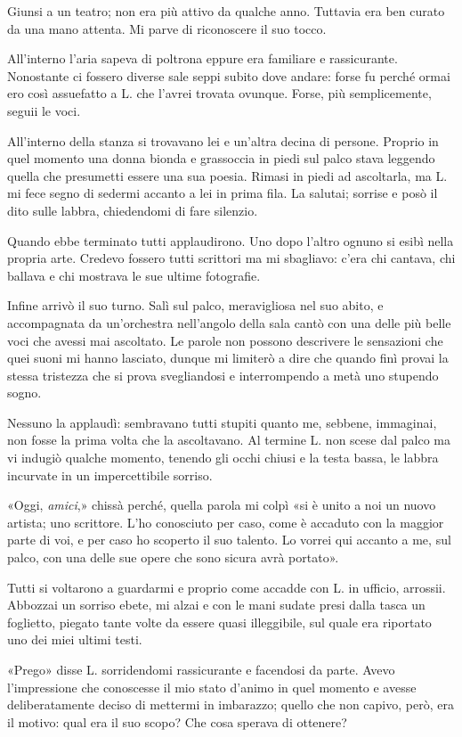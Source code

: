 \documentclass[a4paper,10pt]{memoir}
\begin{document}
Giunsi a un teatro; non era più attivo da qualche anno. Tuttavia era ben curato da una mano attenta. Mi parve di
riconoscere il suo tocco.

All'interno l'aria sapeva di poltrona eppure era familiare e rassicurante. Nonostante ci fossero diverse sale seppi
subito dove andare: forse fu perché ormai ero così assuefatto a L. che l'avrei trovata ovunque. Forse, più
semplicemente, seguii le voci.

All'interno della stanza si trovavano lei e un'altra decina di persone. Proprio in quel momento una donna bionda e
grassoccia in piedi sul palco stava leggendo quella che presumetti essere una sua poesia. Rimasi in piedi ad ascoltarla,
ma L. mi fece segno di sedermi accanto a lei in prima fila. La salutai; sorrise e posò il dito sulle labbra, chiedendomi
di fare silenzio.

Quando ebbe terminato tutti applaudirono. Uno dopo l'altro ognuno si esibì nella propria arte. Credevo fossero tutti
scrittori ma mi sbagliavo: c'era chi cantava, chi ballava e chi mostrava le sue ultime fotografie.

Infine arrivò il suo turno. Salì sul palco, meravigliosa nel suo abito, e accompagnata da un'orchestra nell'angolo della
sala cantò con una delle più belle voci che avessi mai ascoltato. Le parole non possono descrivere le sensazioni che
quei suoni mi hanno lasciato, dunque mi limiterò a dire che quando finì provai la stessa tristezza che si prova
svegliandosi e interrompendo a metà uno stupendo sogno.

Nessuno la applaudì: sembravano tutti stupiti quanto me, sebbene, immaginai, non fosse la prima volta che la
ascoltavano. Al termine L. non scese dal palco ma vi indugiò qualche momento, tenendo gli occhi chiusi e la testa bassa,
le labbra incurvate in un impercettibile sorriso.

«Oggi, \emph{amici},» chissà perché, quella parola mi colpì «si è unito a noi un nuovo artista; uno scrittore. L'ho
conosciuto per caso, come è accaduto con la maggior parte di voi, e per caso ho scoperto il suo talento. Lo vorrei qui
accanto a me, sul palco, con una delle sue opere che sono sicura avrà portato».

Tutti si voltarono a guardarmi e proprio come accadde con L. in ufficio, arrossii. Abbozzai un sorriso ebete, mi alzai e
con le mani sudate presi dalla tasca un foglietto, piegato tante volte da essere quasi illeggibile, sul quale era
riportato uno dei miei ultimi testi.

«Prego» disse L. sorridendomi rassicurante e facendosi da parte. Avevo l'impressione che conoscesse il mio stato d'animo
in quel momento e avesse deliberatamente deciso di mettermi in imbarazzo; quello che non capivo, però, era il motivo:
qual era il suo scopo? Che cosa sperava di ottenere?
\end{document}
